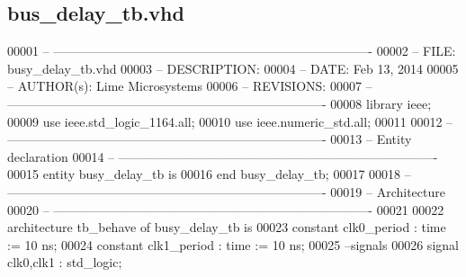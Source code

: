 \subsection{bus\+\_\+delay\+\_\+tb.\+vhd}
\label{bus__delay__tb_8vhd_source}

\begin{DoxyCode}
00001 \textcolor{keyword}{-- ----------------------------------------------------------------------------  }
00002 \textcolor{keyword}{-- FILE:    busy\_delay\_tb.vhd}
00003 \textcolor{keyword}{-- DESCRIPTION:   }
00004 \textcolor{keyword}{-- DATE: Feb 13, 2014}
00005 \textcolor{keyword}{-- AUTHOR(s):  Lime Microsystems}
00006 \textcolor{keyword}{-- REVISIONS:}
00007 \textcolor{keyword}{-- ----------------------------------------------------------------------------  }
00008 \textcolor{vhdlkeyword}{library }\textcolor{keywordflow}{ieee};
00009 \textcolor{vhdlkeyword}{use }ieee.std\_logic\_1164.\textcolor{keywordflow}{all};
00010 \textcolor{vhdlkeyword}{use }ieee.numeric\_std.\textcolor{keywordflow}{all};
00011 
00012 \textcolor{keyword}{-- ----------------------------------------------------------------------------}
00013 \textcolor{keyword}{-- Entity declaration}
00014 \textcolor{keyword}{-- ----------------------------------------------------------------------------}
00015 \textcolor{keywordflow}{entity }busy_delay_tb \textcolor{keywordflow}{is}
00016 \textcolor{keywordflow}{end} \textcolor{vhdlchar}{busy\_delay\_tb};
00017 
00018 \textcolor{keyword}{-- ----------------------------------------------------------------------------}
00019 \textcolor{keyword}{-- Architecture}
00020 \textcolor{keyword}{-- ----------------------------------------------------------------------------}
00021 
00022 \textcolor{keywordflow}{architecture} tb\_behave \textcolor{keywordflow}{of} busy_delay_tb is
00023    \textcolor{keywordflow}{constant} \textcolor{vhdlchar}{clk0_period}   \textcolor{vhdlchar}{:} \textcolor{comment}{time} \textcolor{vhdlchar}{:=} \textcolor{vhdllogic}{}\textcolor{vhdllogic}{10} \textcolor{vhdlchar}{ns};
00024    \textcolor{keywordflow}{constant} \textcolor{vhdlchar}{clk1_period}   \textcolor{vhdlchar}{:} \textcolor{comment}{time} \textcolor{vhdlchar}{:=} \textcolor{vhdllogic}{}\textcolor{vhdllogic}{10} \textcolor{vhdlchar}{ns}; 
00025 \textcolor{keyword}{  --signals}
00026    \textcolor{keywordflow}{signal} \textcolor{vhdlchar}{clk0}\textcolor{vhdlchar}{,}\textcolor{vhdlchar}{clk1}     \textcolor{vhdlchar}{:} \textcolor{comment}{std\_logic};

\end{DoxyCode}
